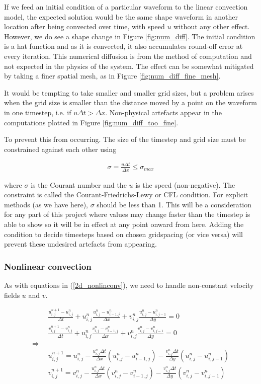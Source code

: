 \documentclass[11pt]{article}
\begin{document}
{If we feed an initial condition of a particular waveform to the linear convection model,
the expected solution would be the same shape waveform in another location after being
convected over time, with speed $u$ without any other effect. However, we do see a shape
change in Figure \ref{fig:num_diff}. The initial condition is a hat function
and as it is convected, it also accumulates round-off error at every iteration. This
numerical diffusion is from the method of computation and not expected in the physics
of the system. The effect can be somewhat mitigated by taking a finer spatial mesh,
as in Figure \ref{fig:num_diff_fine_mesh}.

It would be tempting to take smaller and smaller grid sizes, but a problem arises when
the grid size is smaller than the distance moved by a point on the waveform in one
timestep, i.e. if $u\Delta t > \Delta x$. Non-physical artefacts appear in the computations
plotted in Figure \ref{fig:num_diff_too_fine}.

To prevent this from occurring. The size of the timestep and grid size must be constrained
against each other using

\begin{align}
\sigma = \frac{u \Delta t}{\Delta x} \leq \sigma_{max}
\end{align}

where $\sigma$ is the Courant number and the $u$ is the speed (non-negative).
The constraint is called the Courant-Friedrichs-Lewy or CFL condition.
For explicit methods (as we have here), $\sigma$ should be less than 1.
This will be a consideration for any part of this project where values may change faster
than the timestep is able to show so it will be in effect at any point onward from here.
Adding the condition to decide timesteps based on chosen gridspacing (or vice versa)
will prevent these undesired artefacts from appearing.

\subsubsection{Nonlinear convection}
As with equations in (\ref{2d_nonlinconv}), we need to handle non-constant velocity
fields $u$ and $v$.

\begin{align}
&\frac{u^{n+1}_{i,j} - u^{n}_{i,j}}{\Delta t}
	+ u^n_{i,j} \frac{u^{n}_{i,j} - u^{n}_{i-1,j}}{\Delta x}
	+ v^n_{i,j} \frac{u^{n}_{i,j} - u^{n}_{i,j-1}}{\Delta y} = 0	\nonumber \\
&\frac{v^{n+1}_{i,j} - v^{n}_{i,j}}{\Delta t}
	+ u^n_{i,j} \frac{v^{n}_{i,j} - v^{n}_{i-1,j}}{\Delta x}
	+ v^n_{i,j} \frac{v^{n}_{i,j} - v^{n}_{i,j-1}}{\Delta y} = 0 \\
\Rightarrow ~~ \nonumber \\
&u^{n+1}_{i,j} = u^n_{i,j}
				- \frac{u^n_{i,j} \Delta t}{\Delta x}(u^n_{i,j} - u^n_{i-1,j})
				- \frac{v^n_{i,j} \Delta t}{\Delta y}(u^n_{i,j} - u^n_{i,j-1})
																 \nonumber \\
&v^{n+1}_{i,j} = v^n_{i,j}
				- \frac{u^n_{i,j} \Delta t}{\Delta x}(v^n_{i,j} - v^n_{i-1,j})
				- \frac{v^n_{i,j} \Delta t}{\Delta y}(v^n_{i,j} - v^n_{i,j-1})
\end{align}

}
\end{document}
